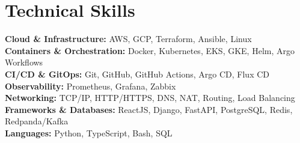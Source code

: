 \documentclass[letterpaper,11pt]{article}
\begin{document}
\section{Technical Skills}
\begin{itemize}[leftmargin=0.15in, label={}]
  \small{\item{
    \textbf{Cloud \& Infrastructure:} AWS, GCP, Terraform, Ansible, Linux \\
    \textbf{Containers \& Orchestration:} Docker, Kubernetes, EKS, GKE, Helm, Argo Workflows \\
    \textbf{CI/CD \& GitOps:} Git, GitHub, GitHub Actions, Argo CD, Flux CD \\
    \textbf{Observability:} Prometheus, Grafana, Zabbix \\
    \textbf{Networking:} TCP/IP, HTTP/HTTPS, DNS, NAT, Routing, Load Balancing \\
    \textbf{Frameworks \& Databases:} ReactJS, Django, FastAPI, PostgreSQL, Redis, Redpanda/Kafka \\
    \textbf{Languages:} Python, TypeScript, Bash, SQL
  }}
\end{itemize}
\end{document}
